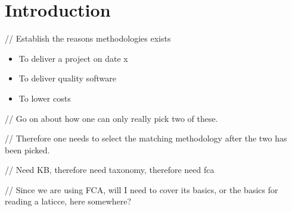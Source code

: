 \section{Introduction}
// Establish the reasons methodologies exists
\cite{einstein_1905}

\begin{itemize}
    \item To deliver a project on date x
    \item To deliver quality software
    \item To lower costs
\end{itemize}

// Go on about how one can only really pick two of these.

// Therefore one needs to select the matching methodology after the two has been picked.

// Need KB, therefore need taxonomy, therefore need fca

// Since we are using FCA, will I need to cover its basics, or the basics for reading a laticce, here somewhere?
